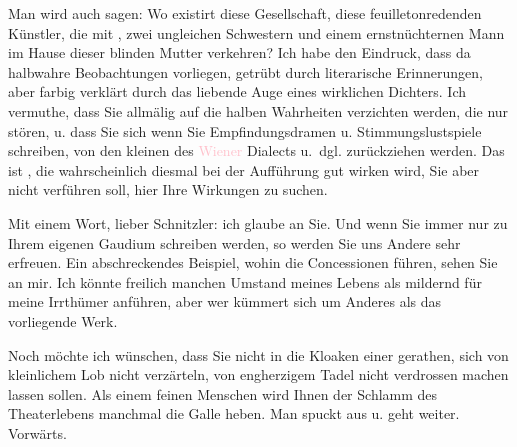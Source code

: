 \pstart
           Man wird auch sagen: Wo existirt diese Gesellschaft, diese feuilletonredenden
               Künstler, die mit \label{K_L03823-8v}\label{K_L03823-8}, zwei ungleichen Schwestern und einem ernstnüchternen Mann
               im Hause dieser blinden Mutter verkehren? Ich habe den Eindruck, dass da halbwahre
               Beobachtungen vorliegen, getrübt durch literarische Erinnerungen, aber farbig
               verklärt durch das liebende Auge eines wirklichen Dichters. Ich vermuthe, dass Sie
               allmälig auf die halben Wahrheiten verzichten werden, die nur stören, {\pb}u. dass Sie sich wenn Sie
               Empfindungsdramen u. Stimmungslustspiele schreiben,  von den kleinen \label{K_L03823-9v}\label{K_L03823-9} des \textcolor{pink}{Wiener}\ledrightnote{\textcolor{pink}{Wien}} Dialects u. dgl. zurückziehen werden. Das ist \label{K_L03823-10v}\label{K_L03823-10}, die wahrscheinlich diesmal bei der Aufführung
               gut wirken wird, Sie aber nicht verführen soll, hier Ihre Wirkungen zu suchen.\pend
           
\pstart
           Mit einem Wort, lieber Schnitzler: ich glaube an Sie. Und wenn Sie immer nur zu Ihrem
               eigenen Gaudium schreiben werden, so werden Sie uns Andere sehr erfreuen. Ein
               abschreckendes Beispiel, wohin die Concessionen führen, sehen Sie an mir. Ich könnte
               freilich manchen Umstand meines Lebens als mildernd für meine Irrthümer anführen,
               aber wer kümmert sich um Anderes als das vorliegende Werk.\pend
           
\pstart
           Noch möchte ich wünschen, dass Sie nicht in die Kloaken einer \label{K_L03823-11v}\label{K_L03823-11}{ }gerathen,
               sich von kleinlichem {\pb}Lob nicht
               verzärteln, von engherzigem Tadel nicht verdrossen machen lassen sollen. Als einem
               feinen Menschen wird Ihnen der Schlamm des Theaterlebens manchmal die Galle heben.
               Man spuckt aus u. geht weiter. Vorwärts.\pend
           

